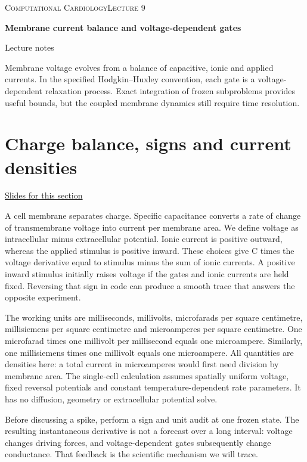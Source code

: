 \documentclass[11pt,letterpaper]{article}
\theoremstyle{definition}\newtheorem{definition}{Definition}\newtheorem{example}{Example}
\numberwithin{equation}{section}
\begin{document}
{\small\scshape Computational Cardiology\hfill Lecture 9}\par\medskip
{\raggedright{}\LARGE\bfseries\color{ink} Membrane current balance and voltage-dependent gates\par}\medskip
{\small Lecture notes}\par\bigskip
Membrane voltage evolves from a balance of capacitive, ionic and applied currents. In the specified Hodgkin--Huxley convention, each gate is a voltage-dependent relaxation process. Exact integration of frozen subproblems provides useful bounds, but the coupled membrane dynamics still require time resolution.

\section{Charge balance, signs and current densities}
\hypertarget{note-charge-balance-signs-and-current-densities}{}\label{note:charge-balance-signs-and-current-densities}
{\small \href{slides.html\#frame=membrane-charge-balance\&step=1}{Slides for this section}}\par
A cell membrane separates charge. Specific capacitance converts a rate of change of transmembrane voltage into current per membrane area. We define voltage as intracellular minus extracellular potential. Ionic current is positive outward, whereas the applied stimulus is positive inward. These choices give C times the voltage derivative equal to stimulus minus the sum of ionic currents. A positive inward stimulus initially raises voltage if the gates and ionic currents are held fixed. Reversing that sign in code can produce a smooth trace that answers the opposite experiment.

The working units are milliseconds, millivolts, microfarads per square centimetre, millisiemens per square centimetre and microamperes per square centimetre. One microfarad times one millivolt per millisecond equals one microampere. Similarly, one millisiemens times one millivolt equals one microampere. All quantities are densities here: a total current in microamperes would first need division by membrane area. The single-cell calculation assumes spatially uniform voltage, fixed reversal potentials and constant temperature-dependent rate parameters. It has no diffusion, geometry or extracellular potential solve.

Before discussing a spike, perform a sign and unit audit at one frozen state. The resulting instantaneous derivative is not a forecast over a long interval: voltage changes driving forces, and voltage-dependent gates subsequently change conductance. That feedback is the scientific mechanism we will trace.
\end{document}
